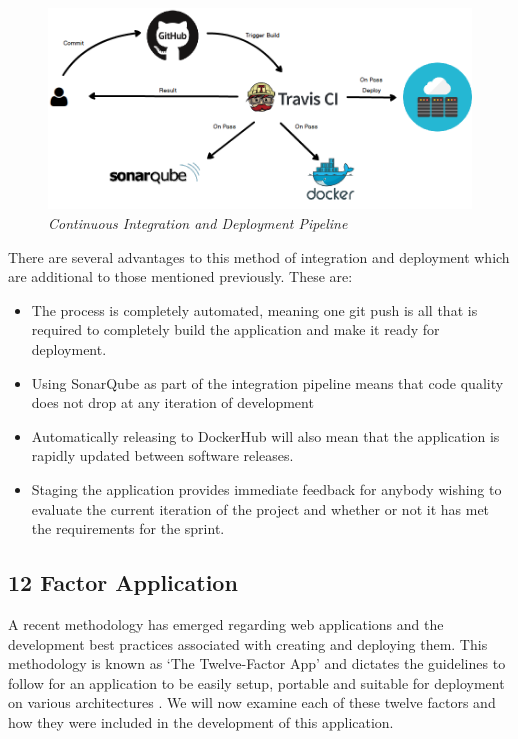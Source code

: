 \begin{figure}[!ht]
\centering
\includegraphics*[width=\textwidth]{images/CI_CD}
\caption{\em Continuous Integration and Deployment Pipeline}
\label{fig:CICD}
\end{figure}

There are several advantages to this method of integration and deployment which are additional to those mentioned previously. These are:

\begin{itemize}
	\item The process is completely automated, meaning one git push is all that is required to completely build the application and make it ready for deployment.
	\item Using SonarQube as part of the integration pipeline means that code quality does not drop at any iteration of development
	\item Automatically releasing to DockerHub will also mean that the application is rapidly updated between software releases.
	\item Staging the application provides immediate feedback for anybody wishing to evaluate the current iteration of the project and whether or not it has met the requirements for the sprint.
\end{itemize} 

\subsection{12 Factor Application}
A recent methodology has emerged regarding web applications and the development best practices associated with creating and deploying them. This methodology is known as `The Twelve-Factor App' and dictates the guidelines to follow for an application to be easily setup, portable and suitable for deployment on various architectures \citep{Wiggins2017}. We will now examine each of these twelve factors and how they were included in the development of this application.


